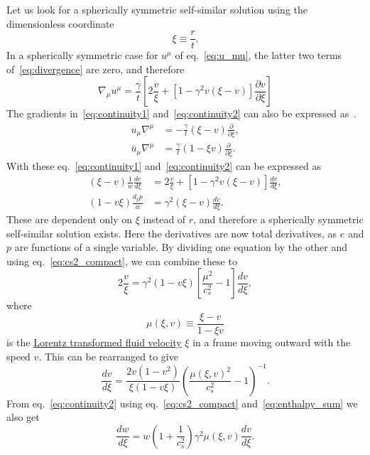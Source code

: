 Let us look for a spherically symmetric self-similar solution using the dimensionless coordinate
\begin{equation}
\xi \equiv \frac{r}{t}.
\end{equation}
In a spherically symmetric case for $u^\mu$ of eq.~\eqref{eq:u_mu},
the latter two terms of~\eqref{eq:divergence} are zero, and therefore
\begin{equation}
\nabla_\mu u^\mu = \frac{\gamma}{t} \left[ 2\frac{v}{\xi} + \left[1 - \gamma^2 v (\xi - v) \right] \frac{\partial v}{\partial \xi} \right]
\end{equation}
The gradients in~\eqref{eq:continuity1} and~\eqref{eq:continuity2} can also be expressed as~\cite[eq. 25]{espinosa_energy_2010}.
\begin{align}
u_\mu \nabla^\mu &= - \frac{\gamma}{t} (\xi - v) \frac{\partial}{\partial \xi}, \\
\bar{u}_\mu \nabla^\mu &= \frac{\gamma}{t} (1 - \xi v) \frac{\partial}{\partial \xi}.
\end{align}
With these eq.~\eqref{eq:continuity1} and~\eqref{eq:continuity2} can be expressed as
\begin{align}
(\xi - v) \frac{1}{w} \frac{de}{d\xi} &= 2 \frac{v}{\xi} + \left[ 1 - \gamma^2 v (\xi - v) \right] \frac{dv}{d\xi}, \\
(1 - v\xi) \frac{d_\xi p}{w} &= \gamma^2 (\xi - v) \frac{dv}{d\xi}.
\end{align}
These are dependent only on $\xi$ instead of $r$,
and therefore a spherically symmetric self-similar solution exists.
Here the derivatives are now total derivatives, as $e$ and $p$ are functions of a single variable.
By dividing one equation by the other and using eq.~\eqref{eq:cs2_compact}, we can combine these to
\begin{equation}
2 \frac{v}{\xi} = \gamma^2 (1 - v\xi) \left[ \frac{\mu^2}{c_s^2} - 1 \right] \frac{dv}{d\xi},
\label{eq:continuity_combined}
\end{equation}
where
\begin{equation}
\mu(\xi,v) \equiv \frac{\xi - v}{1 - \xi v}
\label{eq:mu}
\end{equation}
is the
\href{https://en.wikipedia.org/wiki/Velocity-addition_formula#Standard_configuration}{Lorentz transformed fluid velocity}
$\xi$ in a frame moving outward with the speed $v$.
This can be rearranged to give
\cites[eq. 7.30-7.31]{lecture_notes}[eq. 5]{giese_2021}
\begin{equation}
\frac{dv}{d\xi} = \frac{2v(1-v^2)}{\xi(1-v\xi)} \left( \frac{\mu(\xi,v)^2}{c_s^2} - 1 \right)^{-1}.
\label{eq:hydro_diff1}
\end{equation}
From eq.~\eqref{eq:continuity2} using eq.~\eqref{eq:cs2_compact} and~\eqref{eq:enthalpy_sum} we also get
\begin{equation}
\frac{dw}{d\xi} = w \left( 1 + \frac{1}{c_s^2} \right) \gamma^2 \mu(\xi,v) \frac{dv}{d\xi}.
\label{eq:hydro_diff2}
\end{equation}

